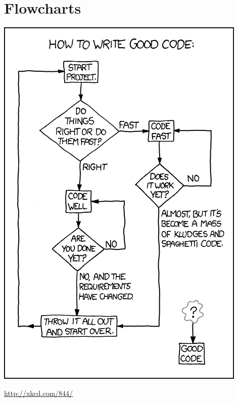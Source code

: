 \part{Flowcharts}
\frame{\partpage}

\begin{frame}
	\begin{center}
		\includegraphics[height=0.9\textheight]{xkcd_good_code}
		
		{\tiny\url{http://xkcd.com/844/}}
	\end{center}
\end{frame}

